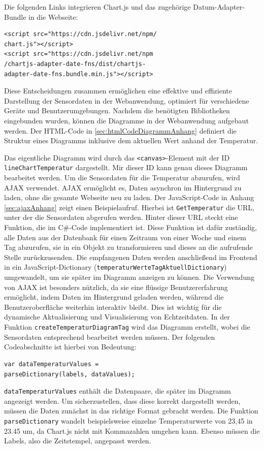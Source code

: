 \documentclass[conference]{IEEEtran}
\begin{document}
Die folgenden Links integrieren Chart.js und das zugehörige Datum-Adapter-Bundle in die Webseite:
\begin{verbatim}
<script src="https://cdn.jsdelivr.net/npm/
chart.js"></script>
<script src="https://cdn.jsdelivr.net/npm
/chartjs-adapter-date-fns/dist/chartjs-
adapter-date-fns.bundle.min.js"></script>
\end{verbatim}
Diese Entscheidungen zusammen ermöglichen eine effektive und effiziente Darstellung der Sensordaten in der Webanwendung, optimiert für verschiedene Geräte und Benutzerumgebungen.
Nachdem die benötigten Bibliotheken eingebunden wurden, können die Diagramme in der Webanwendung aufgebaut werden. Der  HTML-Code in \ref{sec:htmlCodeDiagrammAnhang} definiert die Struktur eines Diagramms inklusive dem aktuellen Wert anhand der Temperatur.

Das eigentliche Diagramm wird durch das \texttt{<canvas>}-Element mit der ID \texttt{lineChartTemperatur} dargestellt. Mir dieser ID kann genau dieses Diagramm bearbeitet werden.
Um die Sensordaten für die Temperatur abzurufen, wird AJAX verwendet. AJAX ermöglicht es, Daten asynchron im Hintergrund zu laden, ohne die gesamte Webseite neu zu laden. Der JavaScript-Code in Anhang \ref{sec:ajaxAnhang} zeigt einen Beispielaufruf.
Hierbei ist \texttt{GetTemperatur} die URL, unter der die Sensordaten abgerufen werden. Hinter dieser URL steckt eine Funktion, die im C\#-Code implementiert ist. Diese Funktion ist dafür zuständig, alle Daten aus der Datenbank für einen Zeitraum von einer Woche und einem Tag abzurufen, sie in ein Objekt zu transformieren und dieses an die aufrufende Stelle zurückzusenden. Die empfangenen Daten werden anschließend im Frontend in ein JavaScript-Dictionary (\texttt{temperaturWerteTagAktuellDictionary}) umgewandelt, um sie später im Diagramm anzeigen zu können.
Die Verwendung von AJAX ist besonders nützlich, da sie eine flüssige Benutzererfahrung ermöglicht, indem Daten im Hintergrund geladen werden, während die Benutzeroberfläche weiterhin interaktiv bleibt. Dies ist wichtig für die dynamische Aktualisierung und Visualisierung von Echtzeitdaten.
In der Funktion \texttt{createTemperaturDiagramTag} wird das Diagramm erstellt, wobei die Sensordaten entsprechend bearbeitet werden müssen. Der folgenden Codeabschnitte ist hierbei von Bedeutung:
\begin{verbatim}var dataTemperaturValues = 
parseDictionary(labels, dataValues); \end{verbatim}
\texttt{dataTemperaturValues} enthält die Datenpaare, die später im Diagramm angezeigt werden. Um sicherzustellen, dass diese korrekt dargestellt werden, müssen die Daten zunächst in das richtige Format gebracht werden. Die Funktion \texttt{parseDictionary} wandelt beispielsweise einzelne Temperaturwerte von 23,45 in 23.45 um, da Chart.js nicht mit Kommazahlen umgehen kann. Ebenso müssen die Labels, also die Zeitstempel, angepasst werden.
\end{document}
